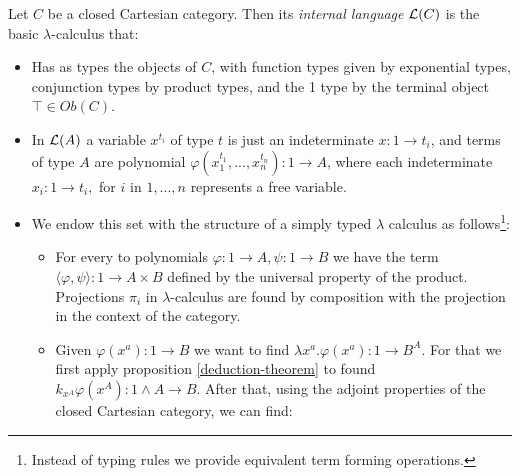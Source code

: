 \begin{definition}
  Let $C$ be a closed Cartesian category. Then its \emph{internal language} $\mathcal{L} (C)$ is the basic $\lambda$-calculus that:
  \begin{itemize}
  \item Has as types the objects of $C$, with function types given by exponential types, conjunction types by product types, and the 1 type by the terminal object $\top \in Ob(C)$.%
  \item In $\mathcal{L}(A)$ a variable $x^{t_i}$ of type $t$ is just an indeterminate  $x:1 \to t_i$, and terms of type $A$ are polynomial $\varphi(x_1^{t_1},...,x_n^{t_n}):1 \to A$, where each indeterminate $x_i: 1 \to t_i,$ for $i$ in $1,...,n$ represents a free variable.
  \item We endow this set with the structure of a simply typed $\lambda$ calculus as follows\footnote{Instead of typing rules we provide equivalent term forming operations.}:
    \begin{itemize}
    \item For every to polynomials $\varphi: 1 \to A, \psi: 1\to B$ we have the term $\langle \varphi, \psi \rangle: 1 \to A\times B$ defined by the universal property of the product. Projections $\pi_i$ in $\lambda$-calculus are found by composition with the projection in the context of the category.
    \item Given $\varphi(x^a):1 \to B$ we want to find $\lambda x^a.\varphi(x^a): 1 \to B^A$.  For that we first apply proposition \ref{deduction-theorem} to found $k_{x^A}\varphi(x^A): 1 \land A \to B$. After that, using the adjoint properties of the closed Cartesian category, we can find:

\end{itemize}
\end{itemize}
\end{definition}
